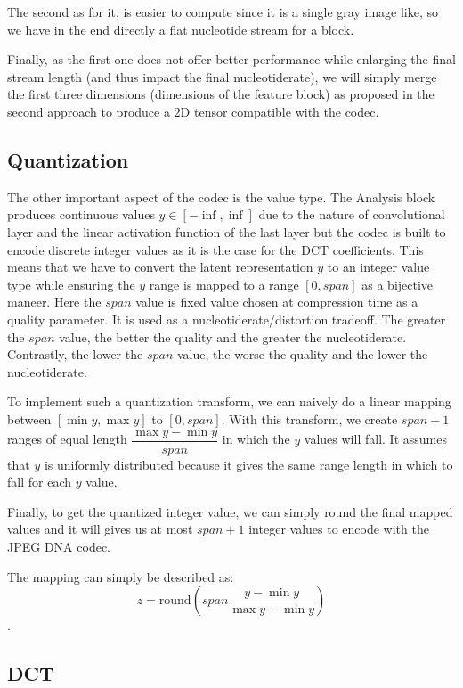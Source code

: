 The second as for it, is easier to compute since it is a single gray image like, so we have in the end directly a flat nucleotide stream for a block. 

Finally, as the first one does not offer better performance while enlarging the final stream length (and thus impact the final nucleotiderate), we will simply merge the first three dimensions (dimensions of the feature block) as proposed in the second approach to produce a $2$D tensor compatible with the codec.

\subsection{Quantization}
\label{subsec:quantization}

The other important aspect of the codec is the value type. The Analysis block produces continuous values $y \in [-\inf, \inf]$ due to the nature of convolutional layer and the linear activation function of the last layer but the codec is built to encode discrete integer values as it is the case for the DCT coefficients. This means that we have to convert the latent representation $y$ to an integer value type while ensuring the $y$ range is mapped to a range $[0, span]$ as a bijective maneer. Here the $span$ value is fixed value chosen at compression time as a quality parameter. It is used as a nucleotiderate/distortion tradeoff. The greater the $span$ value, the better the quality and the greater the nucleotiderate. 
Contrastly, the lower the $span$ value, the worse the quality and the lower the nucleotiderate.

To implement such a quantization transform, we can naively do a linear mapping between $[\min{y}, \max{y}]$ to $[0, span]$. With this transform, we create $span+1$ ranges of equal length $\dfrac{\max{y} - \min{y}}{span}$ in which the $y$ values will fall. 
It assumes that $y$ is uniformly distributed because it gives the same range length in which to fall for each $y$ value.

Finally, to get the quantized integer value, we can simply round the final mapped values and it will gives us at most $span+1$ integer values to encode with the JPEG DNA codec.

The mapping can simply be described as: 
$$z = \text{round} \left(span \frac{y - \min{y}}{\max{y} - \min{y}}\right)$$.

\subsection{DCT}

